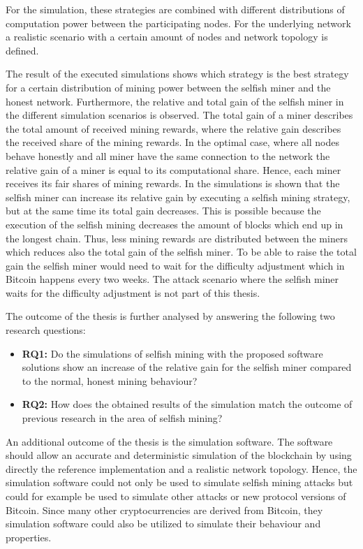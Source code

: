 For the simulation, these strategies are combined with different distributions of computation power between the participating nodes.
For the underlying network a realistic scenario with a certain amount of nodes and network topology is defined.

The result of the executed simulations shows which strategy is the best strategy for a certain distribution of mining power between the selfish miner and the honest network.
Furthermore, the relative and total gain of the selfish miner in the different simulation scenarios is observed.
The total gain of a miner describes the total amount of received mining rewards, where the relative gain describes the received share of the mining rewards.
In the optimal case, where all nodes behave honestly and      all miner have the same connection to the network the relative gain of a miner is equal to its computational share.
Hence, each miner receives its fair shares of mining rewards.
In the simulations is shown that the selfish miner can increase its relative gain by executing a selfish mining strategy, but at the same time its total gain decreases.
This is possible because the execution of the selfish mining decreases the amount of blocks which end up in the longest chain.
Thus, less mining rewards are distributed between the miners which reduces also the total gain of the selfish miner.
To be able to raise the total gain the selfish miner would need to wait for the difficulty adjustment which in Bitcoin happens every two weeks.
The attack scenario where the selfish miner waits for the difficulty adjustment is not part of this thesis.

The outcome of the thesis is further analysed by answering the following two research questions:

\begin{itemize}
	\item \textbf{RQ1:} Do the simulations of selfish mining with the proposed software solutions show an increase of the relative gain for the selfish miner compared to the normal, honest mining behaviour?

	\item \textbf{RQ2:} How does the obtained results of the simulation match the outcome of previous research in the area of selfish mining?
\end{itemize}


An additional outcome of the thesis is the simulation software.
The software should allow an accurate and deterministic simulation of the blockchain by using directly the reference implementation and a realistic network topology.
Hence, the simulation software could not only be used to simulate selfish mining attacks but could for example be used to simulate other attacks or new protocol versions of Bitcoin. 
Since many other cryptocurrencies are derived from Bitcoin, they simulation software could also be utilized to simulate their behaviour and properties.

